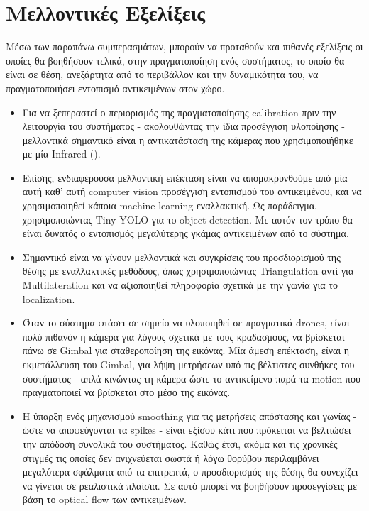 \section{Μελλοντικές Εξελίξεις}
Μέσω των παραπάνω συμπερασμάτων, μπορούν να προταθούν και πιθανές εξελίξεις οι οποίες θα βοηθήσουν τελικά, στην πραγματοποίηση ενός συστήματος, το οποίο θα είναι σε θέση, ανεξάρτητα από το περιβάλλον και την δυναμικότητα του, να πρα\-γμα\-το\-ποιή\-σει εντοπισμό αντικειμένων στον χώρο. 

\begin{itemize}
    \item Για να ξεπεραστεί ο περιορισμός της πραγματοποίησης calibration πριν την λειτουργία του συστήματος - ακολουθώντας την ίδια προσέγγιση υ\-λο\-ποίη\-σης - μελλοντικά σημαντικό είναι η αντικατάσταση της κάμερας που χρησιμοποιήθηκε με μία Infrared ().
    \item Επίσης, ενδιαφέρουσα μελλοντική επέκταση είναι να απομακρυνθούμε από μία αυτή καθ' αυτή computer vision προσέγγιση εντοπισμού του αντικειμένου, και να χρησιμοποιηθεί κάποια machine learning εναλλακτική. Ως παράδειγμα, χρησιμοποιώντας Tiny-YOLO για το object detection. Με αυτόν τον τρόπο θα είναι δυνατός ο εντοπισμός μεγαλύτερης γκάμας αντικειμένων από το σύστημα.
    \item Σημαντικό είναι να γίνουν μελλοντικά και συγκρίσεις του προσδιορισμού της θέσης με εναλλακτικές μεθόδους, όπως χρησιμοποιώντας Triangulation αντί για Multilateration και να αξιοποιηθεί πληροφορία σχετικά με την γωνία για το localization.
    \item Όταν το σύστημα φτάσει σε σημείο να υλοποιηθεί σε πραγματικά drones, είναι πολύ πιθανόν η κάμερα για λόγους σχετικά με τους κραδασμούς, να βρίσκεται πάνω σε Gimbal για σταθεροποίηση της εικόνας. Μία άμεση επέκταση, είναι η εκμετάλλευση του Gimbal, για λήψη μετρήσεων υπό τις βέλτιστες συ\-νθή\-κες του συστήματος - απλά κινώντας τη κάμερα ώστε το αντικείμενο παρά τα motion που πραγματοποιεί να βρίσκεται στο μέσο της εικόνας.
    \item Η ύπαρξη ενός μηχανισμού smoothing για τις μετρήσεις απόστασης και γωνίας - ώστε να αποφεύγονται τα spikes - είναι εξίσου κάτι που πρόκειται να βελτιώσει την απόδοση συνολικά του συστήματος. Καθώς έτσι, ακόμα και τις χρονικές στιγμές τις οποίες δεν ανιχνεύεται σωστά ή λόγω θορύβου περιλαμβάνει με\-γα\-λύ\-τε\-ρα σφάλματα από τα επιτρεπτά, ο προσδιορισμός της θέσης θα συνεχίζει να γίνεται σε ρεαλιστικά πλαίσια. Σε αυτό μπορεί να βοηθήσουν προσεγγίσεις με βάση το optical flow των αντικειμένων.

\end{itemize}
